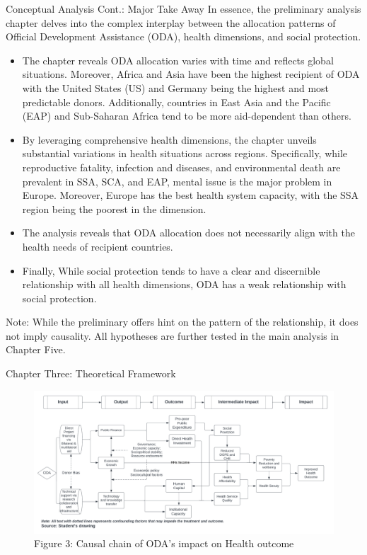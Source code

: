 \documentclass[aspectratio=169,handout, 10pt]{beamer}
\begin{document}
\begin{frame}{Conceptual Analysis Cont.: Major Take Away}
    In essence, the preliminary analysis chapter delves into the complex interplay between the allocation patterns of Official Development Assistance (ODA), health dimensions, and social protection.

\begin{itemize}
    \item The chapter reveals ODA allocation varies with time and reflects global situations. Moreover, Africa and Asia have been the highest recipient of ODA with the United States (US) and Germany being the highest and most predictable donors. Additionally, countries in East Asia and the Pacific (EAP) and Sub-Saharan Africa tend to be more aid-dependent than others. 
    \item By leveraging comprehensive health dimensions, the chapter unveils substantial variations in health situations across regions. Specifically, while reproductive fatality, infection and diseases, and environmental death are prevalent in SSA, SCA, and EAP, mental issue is the major problem in Europe. Moreover, Europe has the best health system capacity, with the SSA region being the poorest in the dimension. 
    \item The analysis reveals that ODA allocation does not necessarily align with the health needs of recipient countries. 
    \item Finally, While social protection tends to have a clear and discernible relationship with all health dimensions, ODA has a weak relationship with social protection. 
\end{itemize}
Note: While the preliminary offers hint on the pattern of the relationship, it does not imply causality. All hypotheses are further tested in the main analysis in Chapter Five. 
\end{frame}




\begin{frame}{Chapter Three: Theoretical Framework}
        \begin{figure}
        \caption{Figure 3: Causal chain of ODA's impact on Health outcome}
            \includegraphics[width=\textwidth]{Figures and Tables/Causal Chain Graph for Thesis.png}
            
        \end{figure}
\end{frame}
\end{document}

